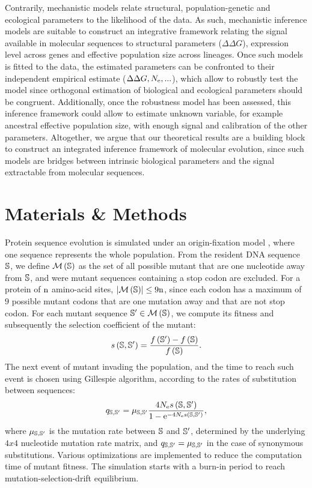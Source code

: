 \documentclass{MBE}%
\begin{document}
Contrarily, mechanistic models relate structural, population-genetic and ecological parameters to the likelihood of the data.
As such, mechanistic inference models are suitable to construct an integrative framework relating the signal available in molecular sequences to structural parameters ($\Delta \Delta G$), expression level across genes and effective population size across lineages.
Once such models is fitted to the data, the estimated parameters can be confronted to their independent empirical estimate ($\Delta \Delta G, N_{\mathrm{e}}, ...$), which allow to robustly test the model since orthogonal estimation of biological and ecological parameters should be congruent. 
Additionally, once the robustness model has been assessed, this inference framework could allow to estimate unknown variable, for example ancestral effective population size, with enough signal and calibration of the other parameters. 
Altogether, we argue that our theoretical results are a building block to construct an integrated inference framework of molecular evolution, since such models are bridges between intrinsic biological parameters and the signal extractable from molecular sequences.

\section*{Materials \& Methods}
Protein sequence evolution is simulated under an origin-fixation model \citep{McCandlish2014}, where one sequence represents the whole population.
From the resident DNA sequence $\mathbb{S}$, we define $\mathcal{M}\left(\mathbb{S}\right)$ as the set of all possible mutant that are one nucleotide away from $\mathbb{S}$, and were mutant sequences containing a stop codon are excluded.
For a protein of $\text{n}$ amino-acid sites, $\left| \mathcal{M}\left(\mathbb{S}\right) \right| \leq 9 \text{n}$, since each codon has a maximum of $9$ possible mutant codons that are one mutation away and that are not stop codon.
For each mutant sequence $\mathbb{S}' \in \mathcal{M}\left(\mathbb{S}\right)$, we compute its fitness and subsequently the selection coefficient of the mutant:
\begin{equation}
s \left( \mathbb{S},\mathbb{S}'\right) = \dfrac{ f \left(\mathbb{S}' \right) - f \left(\mathbb{S}\right) }{f\left( \mathbb{S} \right)}.
\end{equation}
The next event of mutant invading the population, and the time to reach such event is chosen using Gillespie algorithm, according to the rates of substitution between sequences:
\begin{equation}
q_{\mathbb{S}, \mathbb{S}'} = \mu_{\mathbb{S}, \mathbb{S}'} \dfrac{4 N_{\mathrm{e}} s \left( \mathbb{S},\mathbb{S}'\right)}{1 - \mathrm{e}^{-4 N_{\mathrm{e}} s \left( \mathbb{S},\mathbb{S}'\right)}}, 
\end{equation}
where $\mu_{\mathbb{S}, \mathbb{S}'}$ is the mutation rate between $\mathbb{S}$ and $\mathbb{S}'$, determined by the underlying $4x4$ nucleotide mutation rate matrix, and ${q_{\mathbb{S}, \mathbb{S}'}} = \mu_{\mathbb{S}, \mathbb{S}'}$ in the case of synonymous substitutions.
Various optimizations are implemented to reduce the computation time of mutant fitness.
The simulation starts with a burn-in period to reach mutation-selection-drift equilibrium.
\end{document}
